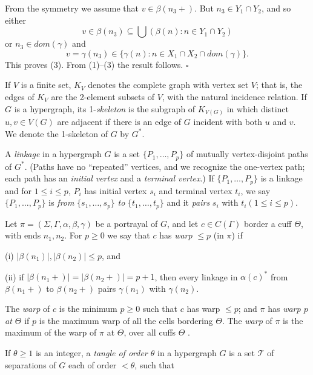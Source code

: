 From the symmetry we assume that $v \in \beta(n_3 +)$. But $n_3 \in Y_1 \cap Y_2$, and so either
\begin{equation*}
v \in \beta(n_3) \subseteq \bigcup (\beta(n) : n \in Y_1 \cap Y_2)
\end{equation*}
or $n_3 \in dom(\gamma)$ and
\begin{equation*}
v = \gamma(n_3) \in \{\gamma(n) : n \in X_1 \cap X_2 \cap dom(\gamma)\}.
\end{equation*}
This proves (3). From (1)--(3) the result follows. $\square$


If $V$ is a finite set, $K_V$ denotes the complete graph with vertex set $V$; that is, the edges of $K_V$ are the 2-element subsets of $V$, with the natural incidence relation. If $G$ is a hypergraph, its 1-\textit{skeleton} is the subgraph of $K_{V(G)}$ in which distinct $u, v \in V(G)$ are adjacent if there is an edge of $G$ incident with both $u$ and $v$. We denote the 1-skeleton of $G$ by $G^*$.

A \textit{linkage} in a hypergraph $G$ is a set $\{P_1, \dots, P_p\}$ of mutually vertex-disjoint paths of $G^*$. (Paths have no ``repeated'' vertices, and we recognize the one-vertex path; each path has an \textit{initial vertex} and a \textit{terminal vertex}.) If $\{P_1, \dots, P_p\}$ is a linkage and for $1 \le i \le p$, $P_i$ has initial vertex $s_i$ and terminal vertex $t_i$, we say $\{P_1, \dots, P_p\}$ is \textit{from} $\{s_1, \dots, s_p\}$ \textit{to} $\{t_1, \dots, t_p\}$ and it \textit{pairs} $s_i$ with $t_i (1 \le i \le p)$.

Let $\pi = (\Sigma, \Gamma, \alpha, \beta, \gamma)$ be a portrayal of $G$, and let $c \in C(\Gamma)$ border a cuff $\Theta$, with ends $n_1, n_2$. For $p \ge 0$ we say that $c$ has \textit{warp} $\le p$ (in $\pi$) if

\hspace*{12pt}(i) $|\beta(n_1)|, |\beta(n_2)| \le p$, and

\hspace*{12pt}(ii) if $|\beta(n_1 +)| = |\beta(n_2 +)| = p + 1$, then every linkage in $\alpha(c)^*$ from $\beta(n_1 +)$ to $\beta(n_2 +)$ pairs $\gamma(n_1)$ with $\gamma(n_2)$.

The \textit{warp} of $c$ is the minimum $p \ge 0$ such that $c$ has warp $\le p$; and $\pi$ has \textit{warp $p$ at $\Theta$} if $p$ is the maximum warp of all the cells bordering $\Theta$. The \textit{warp} of $\pi$ is the maximum of  the warp of $\pi$ at $\Theta$, over all cuffs $\Theta$ .


If $\theta \ge 1$ is an integer, a \textit{tangle of order $\theta$} in a hypergraph $G$ is a set $\mathscr{T}$ of separations of $G$ each of order $< \theta$, such that
